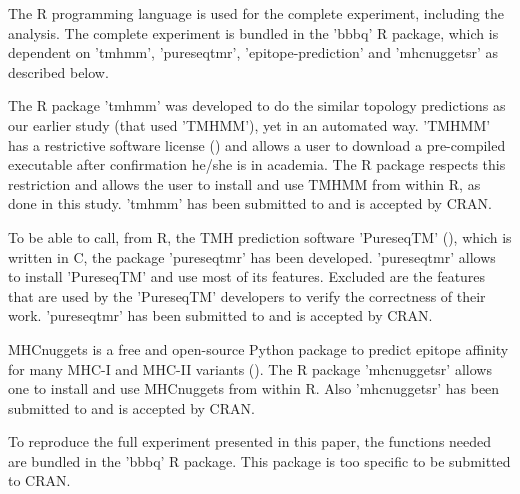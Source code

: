 The R programming language is used for the complete 
experiment, including the analysis.
The complete experiment is bundled in the 'bbbq' R package,
which is dependent on 'tmhmm', 'pureseqtmr', 
'epitope-prediction' and 'mhcnuggetsr'
as described below.


The R package 'tmhmm' was developed to do the similar topology
predictions as our earlier study (that used 'TMHMM'), yet in an automated way.
'TMHMM' has a restrictive software license (\cite{krogh2001predicting}) and allows a user
to download a pre-compiled executable after confirmation he/she
is in academia. The R package respects this restriction
and allows the user to install and use TMHMM from within R,
as done in this study.
'tmhmm' has been submitted to and is accepted by CRAN. 


To be able to call, from R, the TMH prediction 
software 'PureseqTM' (\cite{wang2019efficient}),
which is written in C, the package 'pureseqtmr' has been developed. 
'pureseqtmr' allows to install 'PureseqTM' and use most of its features.
Excluded are the features that are used by the 'PureseqTM' 
developers to verify the correctness of their work.
'pureseqtmr' has been submitted to and is accepted by CRAN.


MHCnuggets is a free and open-source Python package to predict 
epitope affinity for many MHC-I and MHC-II variants (\cite{shao2020high}).
The R package 'mhcnuggetsr' allows one to install and use MHCnuggets
from within R.
Also 'mhcnuggetsr' has been submitted to and is accepted by CRAN.


To reproduce the full experiment presented in this paper,
the functions needed are bundled in the 'bbbq' R package.
This package is too specific to be submitted to CRAN.

